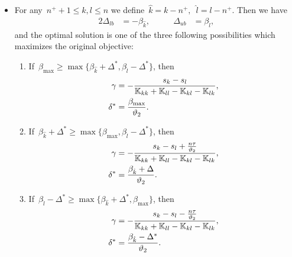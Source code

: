 \begin{theorem}
\begin{itemize}
    \item For any~$n^+ + 1\le k,l \le n$ we define~$\hat{k} = k - n^+,$~$\hat{l} = l - n^+.$ Then we have
    \begin{alignat*}{2}
      \Delta_{lb} & = - \beta_{\hat{k}}, & \qquad
      \Delta_{ub} & = \beta_{\hat{l}},
    \end{alignat*}
    and the optimal solution is one of the three following possibilities which maximizes the original objective:
    \begin{enumerate}
      \item If~$\beta_{\max} \geq \max\{\beta_{\hat{k}} + \Delta^{*}, \beta_{\hat{l}} - \Delta^{*}\}$, then
      \begin{align*}
        \gamma     & = -\frac{s_k - s_l}{\mathbb{K}_{kk} + \mathbb{K}_{ll} - \mathbb{K}_{kl} - \mathbb{K}_{lk}}, \\
        \delta^{*} & = \frac{\beta_{\max}}{\vartheta_2}.
      \end{align*}
      \item If~$\beta_{\hat{k}} + \Delta^{*} \geq \max\{\beta_{\max} , \beta_{\hat{l}} - \Delta^{*}\}$, then
      \begin{align*}
        \gamma     & = -\frac{s_k - s_l + \frac{n\tau}{\vartheta_2}}{\mathbb{K}_{kk} + \mathbb{K}_{ll} - \mathbb{K}_{kl} - \mathbb{K}_{lk}}, \\
        \delta^{*} & = \frac{\beta_{\hat{k}} + \Delta}{\vartheta_2}.
      \end{align*}
      \item If~$\beta_{\hat{l}} - \Delta^{*} \geq \max\{\beta_{\hat{k}} + \Delta^{*}, \beta_{\max}\}$, then
      \begin{align*}
        \gamma     & = -\frac{s_k - s_l - \frac{n\tau}{\vartheta_2}}{\mathbb{K}_{kk} + \mathbb{K}_{ll} - \mathbb{K}_{kl} - \mathbb{K}_{lk}}, \\
        \delta^{*} & = \frac{\beta_{\hat{k}} - \Delta^{*}}{\vartheta_2}.
      \end{align*}
    \end{enumerate}
  \end{itemize}
\end{theorem}